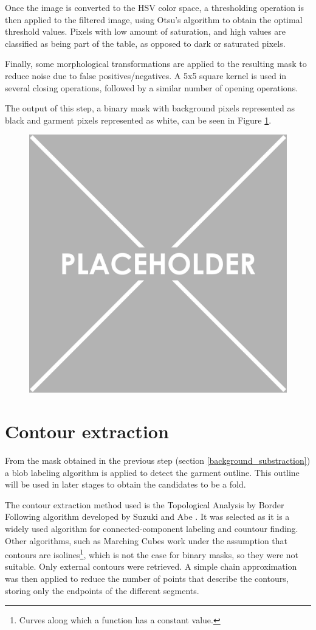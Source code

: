 Once the image is converted to the HSV color space, a thresholding operation is then applied to the filtered image, using Otsu's algorithm  to obtain the optimal threshold values. Pixels with low amount of saturation, and high values are classified as being part of the table, as opposed to dark or saturated pixels.

Finally, some morphological transformations are applied to the resulting mask to reduce noise due to false positives/negatives. A 5x5 square kernel is used in several closing operations, followed by a similar number of opening operations.

The output of this step, a binary mask with background pixels represented as black and garment pixels represented as white, can be seen in Figure \ref{fig:segmentation_mask}.

\begin{figure}[thpb]
    \centering
    \includegraphics[width=0.48
    \textwidth]{figures/placeholder.png}
    \caption{}
    \label{fig:segmentation_mask}
\end{figure}

\section{Contour extraction}
From the mask obtained in the previous step (section \ref{background_substraction}) a blob labeling algorithm is applied to detect the garment outline. This outline will be used in later stages to obtain the candidates to be a fold.

The contour extraction method used is the Topological Analysis by Border Following algorithm developed by Suzuki and Abe  {}. It was selected as it is a widely used algorithm for connected-component labeling and countour finding. Other algorithms, such as Marching Cubes  work under the assumption that contours are isolines\footnote{Curves along which a  function has a constant value.}, which is not the case for binary masks, so they were not suitable. Only external contours were retrieved. A simple chain approximation was then applied to reduce the number of points that describe the contours, storing only the endpoints of the different segments.

